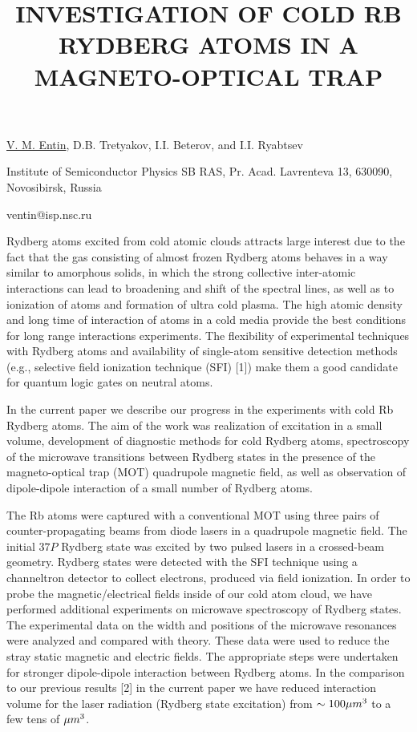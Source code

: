 \title{INVESTIGATION OF COLD RB RYDBERG ATOMS IN A MAGNETO-OPTICAL TRAP}

\underline{V. M. Entin}, D.B. Tretyakov, I.I. Beterov, and I.I.
Ryabtsev   

{\normalsize{\vspace{-4mm}
Institute of Semiconductor Physics SB RAS, Pr. Acad. Lavrenteva 13,
630090, Novosibirsk, Russia

\email ventin@isp.nsc.ru}}

Rydberg atoms excited from cold atomic clouds attracts
large interest due to the fact that the gas consisting of almost frozen
Rydberg atoms behaves in a way similar to amorphous solids, in which
the strong collective inter-atomic interactions can lead to
broadening and shift of the spectral lines, as well as to ionization of
atoms and formation of ultra cold plasma. The high atomic density and
long time of interaction of atoms in a cold media provide the best
conditions for long range interactions experiments. The flexibility of
experimental techniques with Rydberg atoms and availability of
single-atom sensitive detection methods (e.g., selective field
ionization technique (SFI) [1]) make them a good candidate for quantum
logic gates on neutral atoms.

In the current paper we describe our progress in the experiments with
cold Rb Rydberg atoms. The aim of the work was realization of
excitation in a small volume, development of diagnostic methods for
cold Rydberg atoms, spectroscopy of the microwave transitions between
Rydberg states in the presence of the magneto-optical trap (MOT) quadrupole magnetic field, as
well as observation of dipole-dipole interaction of a small number of
Rydberg atoms.

The Rb atoms were captured with a conventional MOT using three pairs of counter-propagating
beams from diode lasers in a quadrupole magnetic field. The initial $37P$ Rydberg state was excited by two pulsed lasers in a
crossed-beam geometry. Rydberg states were detected with the SFI
technique using a channeltron detector to collect electrons, produced
via field ionization. In order to probe the magnetic/electrical
fields inside of our cold atom cloud, we have performed additional
experiments on microwave spectroscopy of Rydberg states. The
experimental data on the width and positions of the microwave
resonances were analyzed and compared with theory. These data were used
to reduce the stray static magnetic and electric fields. The
appropriate steps were undertaken for stronger dipole-dipole
interaction between Rydberg atoms. In the comparison to our previous
results [2] in the current paper we have reduced interaction volume for
the laser radiation (Rydberg state excitation) from $\sim 100
\mu m\textsuperscript{3}$ to a few tens of
$\mu m\textsuperscript{3}$.


